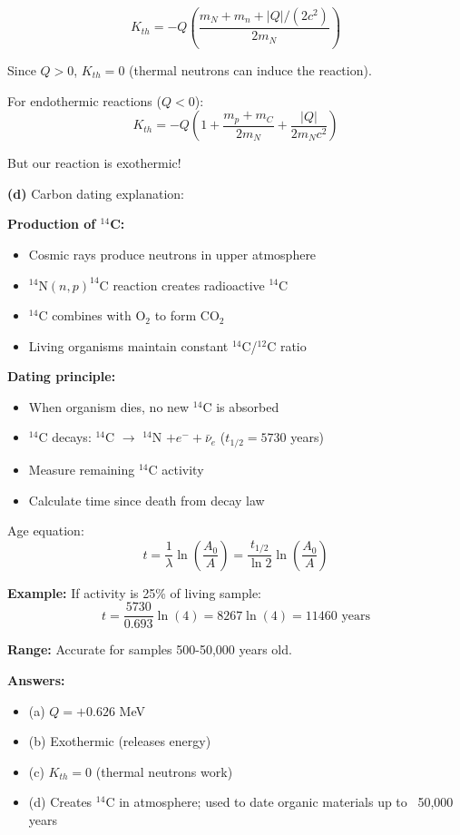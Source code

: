 \documentclass[12pt,a4paper]{article}
\begin{document}
\begin{solution}
$$K_{th} = -Q\left(\frac{m_N + m_n + |Q|/(2c^2)}{2m_N}\right)$$

Since $Q > 0$, $K_{th} = 0$ (thermal neutrons can induce the reaction).

For endothermic reactions ($Q < 0$):
$$K_{th} = -Q\left(1 + \frac{m_p + m_C}{2m_N} + \frac{|Q|}{2m_Nc^2}\right)$$

But our reaction is exothermic!

\textbf{(d)} Carbon dating explanation:

\textbf{Production of $^{14}$C:}
\begin{itemize}
    \item Cosmic rays produce neutrons in upper atmosphere
    \item $^{14}$N$(n,p)^{14}$C reaction creates radioactive $^{14}$C
    \item $^{14}$C combines with O$_2$ to form CO$_2$
    \item Living organisms maintain constant $^{14}$C/$^{12}$C ratio
\end{itemize}

\textbf{Dating principle:}
\begin{itemize}
    \item When organism dies, no new $^{14}$C is absorbed
    \item $^{14}$C decays: $^{14}$C $\to$ $^{14}$N $+ e^- + \bar{\nu}_e$ ($t_{1/2} = 5730$ years)
    \item Measure remaining $^{14}$C activity
    \item Calculate time since death from decay law
\end{itemize}

Age equation:
$$t = \frac{1}{\lambda}\ln\left(\frac{A_0}{A}\right) = \frac{t_{1/2}}{\ln 2}\ln\left(\frac{A_0}{A}\right)$$

\textbf{Example:} If activity is 25\% of living sample:
$$t = \frac{5730}{0.693}\ln(4) = 8267\ln(4) = 11460\text{ years}$$

\textbf{Range:} Accurate for samples 500-50,000 years old.

\textbf{Answers:}
\begin{itemize}
    \item (a) $Q = +0.626$ MeV
    \item (b) Exothermic (releases energy)
    \item (c) $K_{th} = 0$ (thermal neutrons work)
    \item (d) Creates $^{14}$C in atmosphere; used to date organic materials up to ~50,000 years
\end{itemize}
\end{solution}
\end{document}
